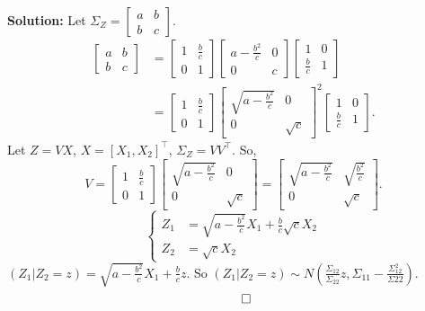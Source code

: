 \documentclass{article}
\newenvironment{solution}{\color{blue} \smallskip \textbf{Solution:}}{}
\begin{document}
\begin{enumerate}[(a)]
    \begin{solution}
        Let $\Sigma_Z = \begin{bmatrix} a & b \\ b & c\end{bmatrix}$.
        \begin{align*}
            \begin{bmatrix} a & b \\ b & c\end{bmatrix} &= 
            \begin{bmatrix} 1 &  \frac{b}{c} \\ 0 & 1\end{bmatrix}
            \begin{bmatrix} a - \frac{b^2}{c} & 0 \\ 0 & c \end{bmatrix}
            \begin{bmatrix} 1 & 0 \\ \frac{b}{c} & 1\end{bmatrix} \\
            &= \begin{bmatrix} 1 &  \frac{b}{c} \\ 0 & 1\end{bmatrix}
            \begin{bmatrix} \sqrt{a - \frac{b^2}{c}} & 0 \\ 0 & \sqrt{c} \end{bmatrix}^2
            \begin{bmatrix} 1 & 0 \\ \frac{b}{c} & 1\end{bmatrix}.
        \end{align*}
        Let $Z = V X$, $X = [X_1, X_2]^\top$, $\Sigma_Z = VV^\top$. So, 
        $$
            V = \begin{bmatrix} 1 &  \frac{b}{c} \\ 0 & 1\end{bmatrix}
            \begin{bmatrix} \sqrt{a - \frac{b^2}{c}} & 0 \\ 0 & \sqrt{c} \end{bmatrix}
            = \begin{bmatrix} \sqrt{a - \frac{b^2}{c}} & \sqrt{\frac{b^2}{c}} \\ 0 & \sqrt{c} \end{bmatrix}.
        $$
        $$
        \begin{cases}
            Z_1 &= \sqrt{a - \frac{b^2}{c}}X_1 + \frac{b}{c}\sqrt{c} X_2 \\
            Z_2 &= \sqrt{c} X_2
        \end{cases}
        $$
        $(Z_1 | Z_2 = z) = \sqrt{a - \frac{b^2}{c}}X_1 + \frac{b}{c}z$. So $(Z_1 | Z_2 = z) \sim N(\frac{\Sigma_{12}}{\Sigma_{22}}z, \Sigma_{11} - \frac{\Sigma_{12}^2}{\Sigma{22}})$.
        \[ \qedhere \]

    \end{solution}
\end{enumerate}
\end{document}
